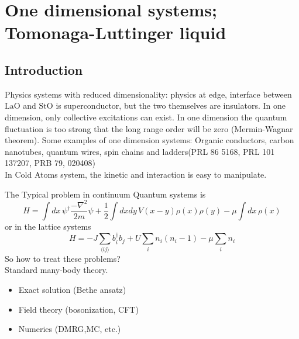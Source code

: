 \documentclass{article}
\begin{document}
\section{One dimensional systems; Tomonaga-Luttinger liquid}
\subsection{Introduction}
Physics systems with reduced dimensionality: physics at edge, interface between $\mathrm{LaO}$ and $\mathrm{StO}$ is superconductor, but the two themselves are insulators. In one dimension, only collective excitations can exist. In one dimension the quantum fluctuation is too strong that the long range order will be zero (Mermin-Wagnar theorem). 
Some examples of one dimension systems: Organic conductors, carbon nanotubes, quantum wires, spin chains and ladders(PRL 86 5168, PRL 101 137207, PRB 79, 020408)\\
In Cold Atoms system, the kinetic and interaction is easy to manipulate. 

The Typical problem in continuum Quantum systems is
$$
H = \int dx \, \psi^\dagger\frac{-\nabla^2}{2m}\psi + \frac{1}{2}\int dxdy\,V(x-y)\rho(x)\rho(y) -\mu\int dx \, \rho(x)
$$
or in the lattice systems
$$
H = -J\sum_{\langle ij\rangle}b^\dagger_ib_j + U\sum_{i}n_i(n_i-1)-\mu\sum_in_i
$$
So how to treat these problems? \\Standard many-body theory.
\begin{itemize}
\item Exact solution (Bethe ansatz)
\item Field theory (bosonization, CFT)
\item Numeries (DMRG,MC, etc.)
\end{itemize}
\end{document}
